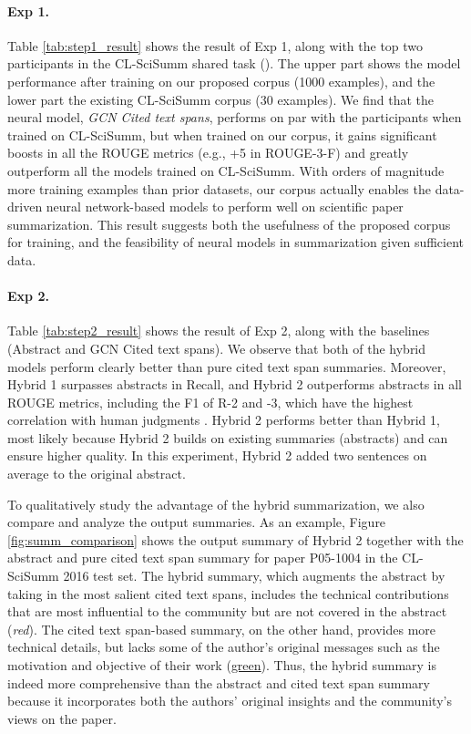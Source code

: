 \documentclass[letterpaper]{article} \usepackage{aaai19}  \usepackage{times}  \usepackage{helvet}  \usepackage{courier}  \usepackage{url}
\begin{document}
\paragraph{Exp 1.}
Table \ref{tab:step1_result} shows the result of Exp 1, along with the top two participants in the CL-SciSumm shared task (\citeauthor{clscisumm_sys8,conroy2015vector_sys3}).
The upper part shows the model performance after training on our proposed corpus (1000 examples), and the lower part the existing CL-SciSumm corpus (30 examples).
We find that the neural model, {\it GCN Cited text spans},
performs on par with the participants when trained on CL-SciSumm, but when trained on our corpus, it gains significant boosts in all the ROUGE metrics (e.g., +5 in ROUGE-3-F) and greatly outperform all the models trained on CL-SciSumm.
With orders of magnitude more training examples than prior datasets, our corpus actually enables the data-driven neural network-based models to perform well on scientific paper summarization. This result suggests both the usefulness of the proposed corpus for training, and the feasibility of neural models in summarization given sufficient data.



\paragraph{Exp 2.}
Table \ref{tab:step2_result} shows the result of Exp 2, along with the baselines (Abstract and GCN Cited text spans).
We observe that both of the hybrid models perform clearly better than pure
cited text span summaries.
Moreover, Hybrid 1 surpasses abstracts in Recall, and
Hybrid 2 outperforms abstracts in all ROUGE metrics, including the F1 of R-2 and -3, which have the highest correlation with human judgments \cite{cohan2016revisiting}.
Hybrid 2 performs better than Hybrid 1, most likely
because Hybrid 2 builds on existing summaries (abstracts) and can ensure higher quality.
In this experiment, Hybrid 2 added two sentences on average to the original abstract.


To qualitatively study the advantage of the hybrid summarization,
we also compare and analyze the output summaries.
As an example, Figure \ref{fig:summ_comparison} shows the output summary of Hybrid 2 together with the abstract and pure cited text span summary for paper P05-1004 in the CL-SciSumm 2016 test set.
The hybrid summary, which augments the abstract
by taking in the most salient cited text spans, includes
the technical contributions that are most influential to the community but are not covered in the abstract ({\it red}).
The cited text span-based summary, on the other hand, provides more technical details, but
lacks some of the author's original messages such as the motivation and objective of their work (\uline{green}).
Thus, the hybrid summary is indeed more comprehensive than the abstract and cited text span summary because it incorporates both the authors' original insights and the community's views on the paper.
\end{document}
